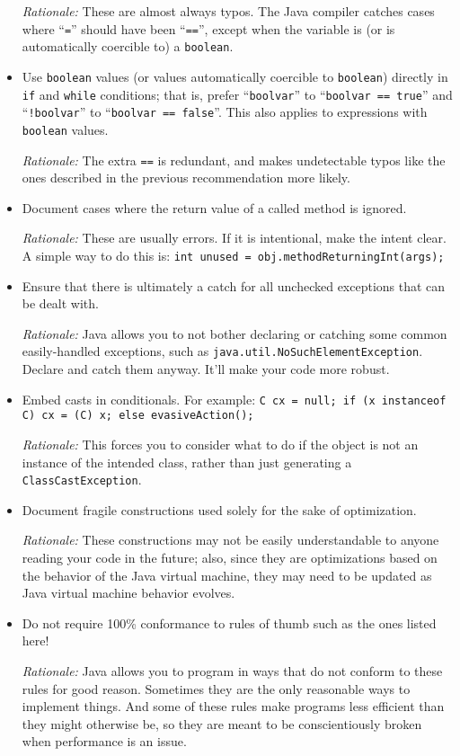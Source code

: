 \begin{itemize}
    \emph{Rationale:} These are almost always typos. The Java compiler catches cases where ``\texttt{=}'' should have been ``\texttt{==}'', except when the variable is (or is automatically coercible to) a \texttt{boolean}.

    \item
    Use \texttt{boolean} values (or values automatically coercible to \texttt{boolean}) directly in \texttt{if} and \texttt{while} conditions; that is, prefer ``\texttt{boolvar}'' to ``\texttt{boolvar == true}'' and ``\texttt{!boolvar}'' to ``\texttt{boolvar == false}''. This also applies to expressions with \texttt{boolean} values.

    \emph{Rationale:} The extra \texttt{==} is redundant, and makes undetectable typos like the ones described in the previous recommendation more likely.

    \item 
    Document cases where the return value of a called method is ignored.

    \emph{Rationale:} These are usually errors. If it is intentional, make the intent clear. A simple way to do this is: \texttt{int unused = obj.methodReturningInt(args);}

    \item
    Ensure that there is ultimately a catch for all unchecked exceptions that can be dealt with.

    \emph{Rationale:} Java allows you to not bother declaring or catching some common easily-handled exceptions, such as \texttt{java.util.NoSuchElementException}. Declare and catch them anyway. It'll make your code more robust.

    \item 
    Embed casts in conditionals. For example: \texttt{C cx = null; if (x instanceof C) cx = (C) x; else evasiveAction();}

    \emph{Rationale:} This forces you to consider what to do if the object is not an instance of the intended class, rather than just generating a \texttt{ClassCastException}.

    \item
    Document fragile constructions used solely for the sake of optimization.

    \emph{Rationale:} These constructions may not be easily understandable to anyone reading your code in the future; also, since they are optimizations based on the behavior of the Java virtual machine, they may need to be updated as Java virtual machine behavior evolves.

    \item
    Do not require 100\% conformance to rules of thumb such as the ones listed here!

    \emph{Rationale:} Java allows you to program in ways that do not conform to these rules for good reason. Sometimes they are the only reasonable ways to implement things. And some of these rules make programs less efficient than they might otherwise be, so they are meant to be conscientiously broken when performance is an issue.

\end{itemize}

